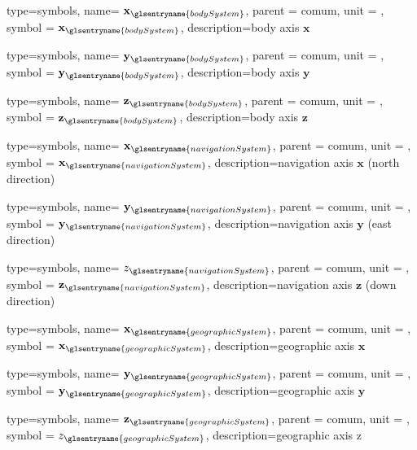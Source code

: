 {type=symbols,
  name= \ensuremath{\mathbf{x}_{\glsentryname{bodySystem}}},
  parent = {comum},
  unit = \unexpanded{},
  symbol = \ensuremath{\mathbf{x}_{\glsentryname{bodySystem}}},
  description={body axis $\mathbf{x}$}
}

{type=symbols,
  name= \ensuremath{\mathbf{y}_{\glsentryname{bodySystem}}},
  parent = {comum},
  unit = \unexpanded{},
  symbol = \ensuremath{\mathbf{y}_{\glsentryname{bodySystem}}},
  description={body axis $\mathbf{y}$}
}

{type=symbols,
  name= \ensuremath{\mathbf{z}_{\glsentryname{bodySystem}}},
  parent = {comum},
  unit = \unexpanded{},
  symbol = \ensuremath{\mathbf{z}_{\glsentryname{bodySystem}}},
  description={body axis $\mathbf{z}$}
}



{type=symbols,
  name= \ensuremath{\mathbf{x}_{\glsentryname{navigationSystem}}},
  parent = {comum},
  unit = \unexpanded{},
  symbol = \ensuremath{\mathbf{x}_{\glsentryname{navigationSystem}}},
  description={navigation axis $\mathbf{x}$ (north direction)}
}

{type=symbols,
  name= \ensuremath{\mathbf{y}_{\glsentryname{navigationSystem}}},
  parent = {comum},
  unit = \unexpanded{},
  symbol = \ensuremath{\mathbf{y}_{\glsentryname{navigationSystem}}},
  description={navigation axis $\mathbf{y}$ (east direction)}
}

{type=symbols,
  name= \ensuremath{z_{\glsentryname{navigationSystem}}},
  parent = {comum},
  unit = \unexpanded{},
  symbol = \ensuremath{\mathbf{z}_{\glsentryname{navigationSystem}}},
  description={navigation axis $\mathbf{z}$ (down direction)}
}

{type=symbols,
  name= \ensuremath{\mathbf{x}_{\glsentryname{geographicSystem}}},
  parent = {comum},
  unit = \unexpanded{},
  symbol = \ensuremath{\mathbf{x}_{\glsentryname{geographicSystem}}},
  description={geographic axis $\mathbf{x}$}
}

{type=symbols,
  name= \ensuremath{\mathbf{y}_{\glsentryname{geographicSystem}}},
  parent = {comum},
  unit = \unexpanded{},
  symbol = \ensuremath{\mathbf{y}_{\glsentryname{geographicSystem}}},
  description={geographic axis $\mathbf{y}$}
}

{type=symbols,
  name= \ensuremath{\mathbf{z}_{\glsentryname{geographicSystem}}},
  parent = {comum},
  unit = \unexpanded{},
  symbol = \ensuremath{z_{\glsentryname{geographicSystem}}},
  description={geographic axis z}
}

